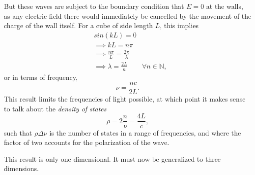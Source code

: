 \documentclass{article}
\begin{document}
But these waves are subject to the boundary condition that $E=0$ at the walls, as any electric field there would immediately be cancelled by the movement of the charge of the wall itself. For a cube of side length $L$, this implies
\begin{equation*}
    \begin{aligned}
        &sin(kL) = 0 \\
        &\implies kL = n\pi\\
        &\implies \frac{n\pi}{L} = \frac{2\pi}{\lambda}\\
        &\implies \lambda = \frac{2L}{n} &\forall n \in \mathbb{N}   ,
    \end{aligned}
\end{equation*}
or in terms of frequency,
\begin{equation*}
    \nu = \frac{nc}{2L}.
\end{equation*}
This result limits the frequencies of light possible, at which point it makes sense to talk about the \emph{density of states}
\begin{equation*}
    \rho = 2 \frac{n}{\nu}= \frac{4L}{c},
\end{equation*}
such that $\rho\Delta\nu$ is the number of states in a range of frequencies, and where the factor of two accounts for the polarization of the wave.

This result is only one dimensional. It must now be generalized to three dimensions.
\end{document}
